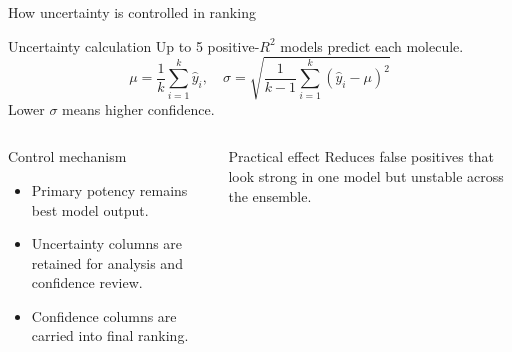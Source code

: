 \documentclass[aspectratio=169,10pt]{beamer}
\begin{document}
\begin{frame}{How uncertainty is controlled in ranking}
  \small
  \begin{block}{Uncertainty calculation}
    Up to 5 positive-\(R^2\) models predict each molecule.
    \[
      \mu = \frac{1}{k}\sum_{i=1}^{k}\hat{y}_i,
      \quad
      \sigma = \sqrt{\frac{1}{k-1}\sum_{i=1}^{k}(\hat{y}_i-\mu)^2}
    \]
    Lower \(\sigma\) means higher confidence.
  \end{block}

  \begin{columns}[T]
      \begin{block}{Control mechanism}
        \begin{itemize}
          \item Primary potency remains best model output.
          \item Uncertainty columns are retained for analysis and confidence review.
          \item Confidence columns are carried into final ranking.
        \end{itemize}
      \end{block}
      \begin{alertblock}{Practical effect}
        Reduces false positives that look strong in one model but unstable
        across the ensemble.
      \end{alertblock}
  \end{columns}
\end{frame}
\end{document}
